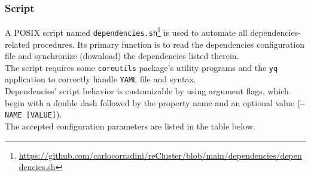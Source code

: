 \subsubsection{Script}
\label{subsec:implementation_dependencies_management_script}

A POSIX script named \texttt{dependencies.sh}\footnote{\url{https://github.com/carlocorradini/reCluster/blob/main/dependencies/dependencies.sh}}
is used to automate all dependencies-related procedures. Its primary function is
to read the dependencies configuration file and synchronize (download) the
dependencies listed therein. \\ %
The script requires some \texttt{coreutils} package's utility programs and the \texttt{yq}
application to correctly handle \texttt{YAML} file and syntax. \\ %
Dependencies' script behavior is customizable by using argument flags, which begin
with a double dash followed by the property name and an optional value (\texttt{--NAME
[VALUE]}). \\ %
The accepted configuration parameters are listed in the table below.

